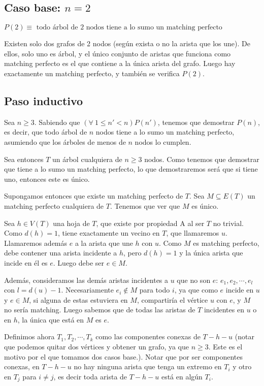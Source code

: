 \documentclass{article}
\begin{document}
\subsection{Caso base: $n = 2$}

$P(2) \equiv \mbox{ todo árbol de $2$ nodos tiene a lo sumo un matching perfecto}$

Existen solo dos grafos de 2 nodos (según exista o no la arista que los une). De ellos, solo uno es árbol, y el único conjunto de aristas que funciona como
matching perfecto es el que contiene a la única arista del grafo. Luego hay exactamente un matching perfecto, y también se verifica $P(2)$.

\subsection{Paso inductivo}

Sea $n \geq 3$. Sabiendo que $(\forall \ 1 \leq n' < n) P(n')$, tenemos que demostrar $P(n)$, es decir, que todo árbol de $n$ nodos
tiene a lo sumo un matching perfecto, asumiendo que los árboles de menos de $n$ nodos lo cumplen.

Sea entonces $T$ un árbol cualquiera de $n \geq 3$ nodos. Como tenemos que demostrar que tiene a lo sumo un matching perfecto, lo que demostraremos será
que si tiene uno, entonces este es único.

Supongamos entonces que existe un matching perfecto de $T$. Sea $M \subseteq E(T)$ un matching perfecto cualquiera de $T$. Tenemos que ver que $M$ es único.

Sea $h \in V(T)$ una hoja de $T$, que existe por propiedad A al ser $T$ no trivial. Como $d(h) = 1$, tiene exactamente un vecino en $T$, que llamaremos $u$.
Llamaremos además $e$ a la arista que une $h$ con $u$. Como $M$ es matching perfecto, debe contener una arista incidente a $h$, pero $d(h) = 1$ y la única
arista que incide en él es $e$. Luego debe ser $e \in M$.

Además, consideramos las demás aristas incidentes a $u$ que no son $e$: $e_1, e_2, \cdots , e_l$ con $l = d(u) - 1$. Necesariamente $e_i \notin M$ para todo
$i$, ya que como $e$ incide en $u$ y $e \in M$, si alguna de estas estuviera en $M$, compartiría el vértice $u$ con $e$, y $M$ no sería matching.
Luego sabemos que de todas las aristas de $T$ incidentes en $u$ o en $h$, la única que está en $M$ es $e$.

Definimos ahora $T_1, T_2, \cdots, T_k$ como las componentes conexas de $T - h - u$ (notar que podemos quitar dos vértices y obtener un grafo, ya que $n \geq 3$. Este es el motivo por el que tomamos dos casos base.).
Notar que por ser componentes conexas, en $T - h - u$ no hay ninguna arista que tenga un extremo en $T_i$ y otro en $T_j$ para $i \neq j$, es decir
toda arista de $T - h - u$ está en algún $T_i$.
\end{document}

